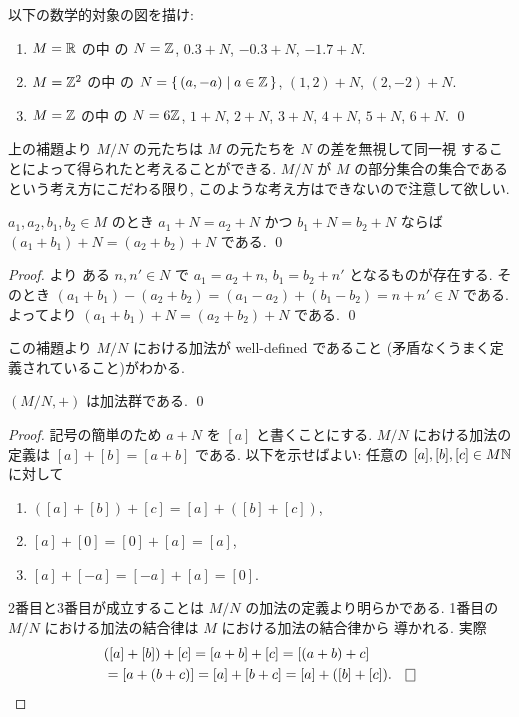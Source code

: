 \documentclass[12pt,twoside]{jarticle}
\begin{document}
\begin{question}
 以下の数学的対象の図を描け:
 \begin{enumerate}
  \item $M={\mathbb R}$ の中
   の $N={\mathbb Z}$, $0.3+N$, $-0.3+N$, $-1.7+N$.
  \item $M={\mathbb Z}^2$ の中
   の $N=\{\,(a,-a)\mid a\in{\mathbb Z}\,\}$, $(1,2)+N$, $(2,-2)+N$.
  \item $M={\mathbb Z}$ の中
   の $N=6{\mathbb Z}$, $1+N$, $2+N$, $3+N$, $4+N$, $5+N$, $6+N$.
  \qed
 \end{enumerate}
\end{question}

上の補題より $M/N$ の元たちは $M$ の元たちを $N$ の差を無視して同一視
することによって得られたと考えることができる.
$M/N$ が $M$ の部分集合の集合であるという考え方にこだわる限り, 
このような考え方はできないので注意して欲しい.

\begin{lemma}
 $a_1,a_2,b_1,b_2\in M$ のとき %
 $a_1+N=a_2+N$ かつ $b_1+N=b_2+N$ ならば $(a_1+b_1)+N=(a_2+b_2)+N$ 
 である. \qed
\end{lemma}

\begin{proof}
 より
 ある $n,n'\in N$ で $a_1=a_2+n$, $b_1=b_2+n'$ となるものが存在する. 
 そのとき $(a_1+b_1) - (a_2+b_2) = (a_1-a_2)+(b_1-b_2) = n+n'\in N$ である. 
 よってより $(a_1+b_1)+N=(a_2+b_2)+N$ である.
 \qed
\end{proof}

この補題より $M/N$ における加法が well-defined であること
(矛盾なくうまく定義されていること)がわかる.

\begin{lemma}
 $(M/N,+)$ は加法群である. \qed
\end{lemma}

\begin{proof}
 記号の簡単のため $a+N$ を $[a]$ と書くことにする.
 $M/N$ における加法の定義は $[a]+[b]=[a+b]$ である.
 以下を示せばよい: 任意の $[a],[b],[c]\in M{\mathbb N}$ に対して
 \begin{enumerate}
  \item $([a]+[b])+[c]=[a]+([b]+[c])$,
  \item $[a]+[0]=[0]+[a]=[a]$,
  \item $[a]+[-a]=[-a]+[a]=[0]$.
 \end{enumerate}
 2番目と3番目が成立することは $M/N$ の加法の定義より明らかである.
 1番目の $M/N$ における加法の結合律は $M$ における加法の結合律から
 導かれる. 実際
 \begin{align*}
  &
  ([a]+[b])+[c]
  =[a+b]+[c]
  =[(a+b)+c]
  \\ &
  =[a+(b+c)]
  =[a]+[b+c]
  =[a]+([b]+[c]).
  \qed
 \end{align*}
\end{proof}
\end{document}

